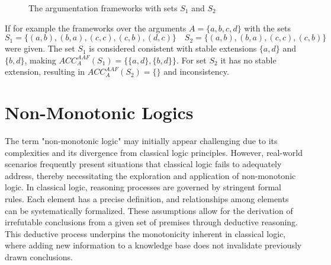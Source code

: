 \begin{figure}
      \centering
      \qquad
      \caption{The argumentation frameworks with sets \(S_1\) and \(S_2\)}
\end{figure}

If for example the frameworks over the arguments \(A = \{a,b,c,d\}\) with the sets
\[S_1 = \{(a,b),(b,a),(c,c),(c,b),(d,c)\} \quad S_2 = \{(a,b),(b,a),(c,c),(c,b)\}\]
were given.
The set \(S_1\) is considered consistent with stable extensions \(\{a,d\}\) and \(\{b,d\}\), making \(ACC^{AAF}_{A}(S_1) = \{\{a,d\},\{b,d\}\}\).
For set \(S_2\) it has no stable extension, resulting in \(ACC^{AAF}_{A}(S_2) = \{\}\) and inconsistency.

\section{Non-Monotonic Logics}
The term "non-monotonic logic" may initially appear challenging due to its complexities and its divergence from classical logic principles.
However, real-world scenarios frequently present situations that classical logic fails to adequately address, thereby necessitating the exploration and application of non-monotonic logic.
In classical logic, reasoning processes are governed by stringent formal rules.
Each element has a precise definition, and relationships among elements can be systematically formalized.
These assumptions allow for the derivation of irrefutable conclusions from a given set of premises through deductive reasoning.
This deductive process underpins the monotonicity inherent in classical logic, where adding new information to a knowledge base does not invalidate previously drawn conclusions.

